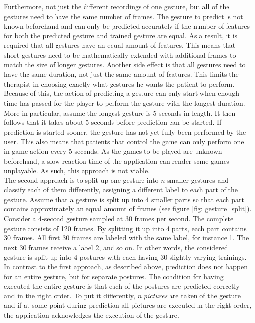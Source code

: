 Furthermore, not just the different recordings of one gesture, but all of the gestures need to have the same number of frames. The gesture to predict is not known beforehand and can only be predicted accurately if the number of features for both the predicted gesture and trained gesture are equal. As a result, it is required that all gestures have an equal amount of features. This means that short gestures need to be mathematically extended with additional frames to match the size of longer gestures. Another side effect is that all gestures need to have the same duration, not just the same amount of features. This limits the therapist in choosing exactly what gestures he wants the patient to perform. Because of this, the action of predicting a gesture can only start when enough time has passed for the player to perform the gesture with the longest duration. More in particular, assume the longest gesture is 5 seconds in length. It then follows that it takes about 5 seconds before prediction can be started. If prediction is started sooner, the gesture has not yet fully been performed by the user. This also means that patients that control the game can only perform one in-game action every 5 seconds. As the games to be played are unknown beforehand, a slow reaction time of the application can render some games unplayable. As such, this approach is not viable.\\

The second approach is to split up one gesture into $n$ smaller gestures and classify each of them differently, assigning a different label to each part of the gesture. Assume that a gesture is split up into 4 smaller parts so that each part contains approximately an equal amount of frames (see figure \ref{fig: gesture_split}). Consider a 4-second gesture sampled at 30 frames per second. The complete gesture consists of 120 frames. By splitting it up into 4 parts, each part contains 30 frames. All first 30 frames are labeled with the same label, for instance 1. The next 30 frames receive a label 2, and so on. In other words, the considered gesture is split up into 4 postures with each having 30 slightly varying trainings. In contrast to the first approach, as described above, prediction does not happen for an entire gesture, but for separate postures. The condition for having executed the entire gesture is that each of the postures are predicted correctly and in the right order. To put it differently, $n$ \emph{pictures} are taken of the gesture and if at some point during prediction all pictures are executed in the right order, the application acknowledges the execution of the gesture.\\

